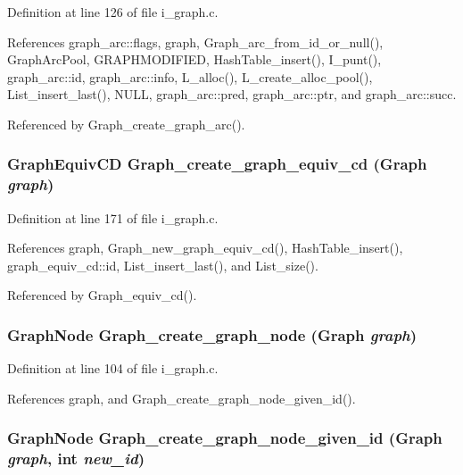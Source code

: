 Definition at line 126 of file i\_\-graph.c.

References graph\_\-arc::flags, graph, Graph\_\-arc\_\-from\_\-id\_\-or\_\-null(), Graph\-Arc\-Pool, GRAPHMODIFIED, Hash\-Table\_\-insert(), I\_\-punt(), graph\_\-arc::id, graph\_\-arc::info, L\_\-alloc(), L\_\-create\_\-alloc\_\-pool(), List\_\-insert\_\-last(), NULL, graph\_\-arc::pred, graph\_\-arc::ptr, and graph\_\-arc::succ.

Referenced by Graph\_\-create\_\-graph\_\-arc().
\subsubsection{\setlength{\rightskip}{0pt plus 5cm}\bf{Graph\-Equiv\-CD} Graph\_\-create\_\-graph\_\-equiv\_\-cd (\bf{Graph} {\em graph})}\label{i__graph_8c_f52c0d4d8ab0c2d6ce81e4917470f9cd}




Definition at line 171 of file i\_\-graph.c.

References graph, Graph\_\-new\_\-graph\_\-equiv\_\-cd(), Hash\-Table\_\-insert(), graph\_\-equiv\_\-cd::id, List\_\-insert\_\-last(), and List\_\-size().

Referenced by Graph\_\-equiv\_\-cd().
\subsubsection{\setlength{\rightskip}{0pt plus 5cm}\bf{Graph\-Node} Graph\_\-create\_\-graph\_\-node (\bf{Graph} {\em graph})}\label{i__graph_8c_23fe203e14349c2875bb285f0727cc2d}




Definition at line 104 of file i\_\-graph.c.

References graph, and Graph\_\-create\_\-graph\_\-node\_\-given\_\-id().
\subsubsection{\setlength{\rightskip}{0pt plus 5cm}\bf{Graph\-Node} Graph\_\-create\_\-graph\_\-node\_\-given\_\-id (\bf{Graph} {\em graph}, int {\em new\_\-id})}\label{i__graph_8c_3ec162de5f8931740e3497fa03eb8d17}




